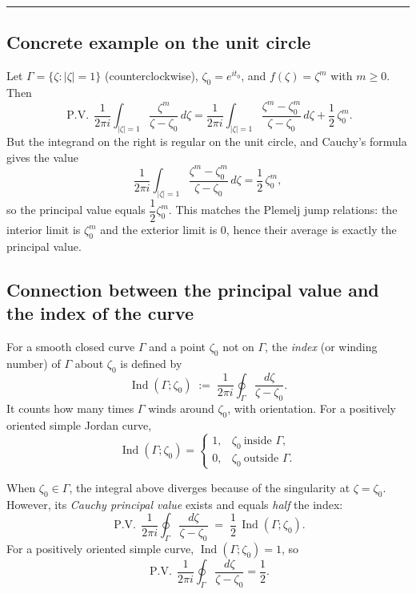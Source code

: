 \documentclass[11pt]{article}
\begin{document}
	\bigskip\hrule\bigskip
	
	\subsection*{Concrete example on the unit circle}
	
	Let $\Gamma=\{\zeta:|\zeta|=1\}$ (counterclockwise), $\zeta_{0}=e^{it_{0}}$, and $f(\zeta)=\zeta^{m}$ with $m\ge 0$.
	Then
	\[
	\operatorname{P.V.}\,\frac{1}{2\pi i}\int_{|\zeta|=1}\frac{\zeta^{m}}{\zeta-\zeta_{0}}\,d\zeta
	=
	\frac{1}{2\pi i}\int_{|\zeta|=1}\frac{\zeta^{m}-\zeta_{0}^{m}}{\zeta-\zeta_{0}}\,d\zeta
	+\frac{1}{2}\,\zeta_{0}^{m}.
	\]
	But the integrand on the right is regular on the unit circle, and Cauchy’s formula gives the value
	\[
	\frac{1}{2\pi i}\int_{|\zeta|=1}\frac{\zeta^{m}-\zeta_{0}^{m}}{\zeta-\zeta_{0}}\,d\zeta
	=\frac{1}{2}\,\zeta_{0}^{m},
	\]
	so the principal value equals $\dfrac{1}{2}\zeta_{0}^{m}$.
	This matches the Plemelj jump relations: the interior limit is $\zeta_{0}^{m}$ and the exterior limit is $0$, hence their average is exactly the principal value.
	
	
	
	\subsection*{Connection between the principal value and the index of the curve}
	
	For a smooth closed curve $\Gamma$ and a point $\zeta_{0}$ not on $\Gamma$, the \emph{index} (or winding number) of $\Gamma$ about $\zeta_{0}$ is defined by
	\[
	\operatorname{Ind}(\Gamma;\zeta_{0})
	\;:=\;
	\frac{1}{2\pi i}\oint_{\Gamma}\frac{d\zeta}{\zeta-\zeta_{0}}.
	\]
	It counts how many times $\Gamma$ winds around $\zeta_{0}$, with orientation.
	For a positively oriented simple Jordan curve,
	\[
	\operatorname{Ind}(\Gamma;\zeta_{0})=
	\begin{cases}
		1,& \zeta_{0}\ \text{inside }\Gamma,\\[4pt]
		0,& \zeta_{0}\ \text{outside }\Gamma.
	\end{cases}
	\]
	
	\medskip
	
	When $\zeta_{0}\in\Gamma$, the integral above diverges because of the singularity at $\zeta=\zeta_{0}$.
	However, its \emph{Cauchy principal value} exists and equals \emph{half} the index:
	\[
	\operatorname{P.V.}\,\frac{1}{2\pi i}\oint_{\Gamma}\frac{d\zeta}{\zeta-\zeta_{0}}
	\;=\;
	\frac{1}{2}\,\operatorname{Ind}(\Gamma;\zeta_{0}).
	\]
	For a positively oriented simple curve, $\operatorname{Ind}(\Gamma;\zeta_{0})=1$,
	so
	\[
	\operatorname{P.V.}\,\frac{1}{2\pi i}\oint_{\Gamma}\frac{d\zeta}{\zeta-\zeta_{0}}
	=\frac{1}{2}.
	\]
	
\end{document}
